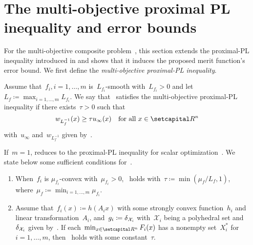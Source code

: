 \documentclass[../main]{subfiles}
\begin{document}
\section{The multi-objective proximal PL inequality and error bounds} 
For the multi-objective composite problem~, this section extends the proximal-PL inequality introduced in  and shows that it induces the proposed merit function's error bound.
We first define the \emph{multi-objective proximal-PL inequality}.
\begin{definition} 
    Assume that~$f_i, i = 1, \dots, m$ is~$L_{f_i}$-smooth with~$L_{f_i} > 0$ and let~$L_f \coloneqq \max_{i = 1, \dots, m} L_{f_i}$.
    We say that~ satisfies the multi-objective proximal-PL inequality if there exists~$\tau > 0$ such that
    \begin{equation} \label{eq:proximal_PL_MO}
        w_{L_f^{-1}}(x) \ge \tau u_\infty(x) \forallcondition{x \in \setR^n}
    \end{equation}
    with~$u_\infty$ and~$w_{L_f^{-1}}$ given by~.
\end{definition}
If~$m = 1$,  reduces to the proximal-PL inequality for scalar optimization~.
We state below some sufficient conditions for~.
\begin{proposition} 
    \begin{enumerate}
        \item When~$f_i$ is $\mu_{f_i}$-convex with~$\mu_{f_i} > 0$,~ holds with~$\tau \coloneqq \min (\mu_f / L_f, 1)$, where~$\mu_f \coloneqq \min_{i = 1, \dots, m} \mu_{f_i}$. 
        \item Assume that~$f_i(x) \coloneqq h(A_i x)$ with some strongly convex function~$h_i$ and linear transformation~$A_i$, and~$g_i \coloneqq \operatorname{\delta}_{\mathcal{X}_i}$ with~$\mathcal{X}_i$ being a polyhedral set and~$\operatorname{\delta}_{\mathcal{X}_i}$ given by~.
              If each~$\min_{x \in \setR^n} F_i(x)$ has a nonempty set~$X_i^*$ for~$i = 1, \dots, m$, then~ holds with some constant~$\tau$. 
    \end{enumerate}
\end{proposition}
\end{document}
